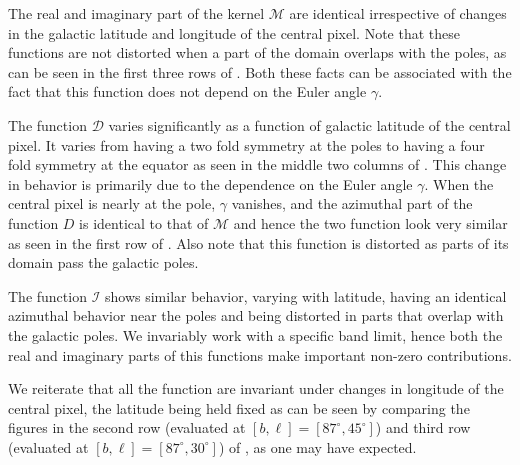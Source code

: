 The real and imaginary part of the kernel $\mathcal{M}$ are identical irrespective of changes in the galactic latitude and longitude of the central pixel. Note that these functions are not distorted when a part of the domain overlaps with the poles, as can be seen in the first three rows of . Both these facts can be associated with the fact that this function does not depend on the Euler angle $\gamma$. %

The function $\mathcal{D}$ varies significantly as a function of galactic latitude of the central pixel. It varies from having a two fold symmetry at the poles to having a four fold symmetry at the equator as seen in the middle two columns of . This change in behavior is primarily due to the  dependence on the Euler angle $\gamma$. When the central pixel is nearly at the pole, $\gamma$ vanishes, and the azimuthal part of the function $D$ is identical to that of $\mathcal{M}$ and hence the two function look very similar as seen in the first row of . Also note that this function is distorted as parts of its domain pass the galactic poles.  

The function $\mathcal{I}$ shows similar behavior, varying with latitude, having an identical azimuthal behavior near the poles and being distorted in parts that overlap with the galactic poles.   We invariably work with a specific band limit, hence both the real and imaginary parts of this functions make important non-zero contributions. 

We reiterate that all the function are invariant under changes in longitude of the central pixel, the latitude being held fixed as can be seen by comparing the figures in the second row (evaluated at $[b,\ell]=[87^{\circ},45^{\circ}]$) and third row (evaluated at $[b,\ell]=[87^{\circ},30^{\circ}]$) of , as one may have expected.

